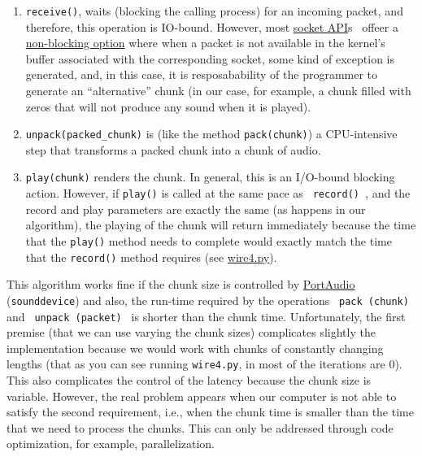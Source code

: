 \begin{enumerate}
\item \verb|receive()|, waits (blocking the calling process) for an
  incoming packet, and therefore, this operation is IO-bound. However,
  most \href{https://docs.python.org/3/library/socket.html}{socket
    API}s~\cite{python} offeer a
  \href{https://docs.python.org/3.8/library/socket.html#socket.socket.setblocking}{non-blocking
    option} where when a packet is not available in the kernel's
  buffer associated with the corresponding socket, some kind of
  exception is generated, and, in this case, it is resposabability of
  the programmer to generate an ``alternative'' chunk (in our case,
  for example, a chunk filled with zeros that will not produce any
  sound when it is played).

\item \verb|unpack(packed_chunk)| is (like the method
  \texttt{pack(chunk)}) a CPU-intensive step that transforms a
  packed chunk into a chunk of audio.

\item \verb|play(chunk)| renders the chunk. In general, this is an
  I/O-bound blocking action. However, if \verb|play()| is called at
  the same pace as \verb | record() |, and the record and play
  parameters are exactly the same (as happens in our algorithm), the
  playing of the chunk will return immediately because the time that
  the \verb|play()| method needs to complete would exactly match the
  time that the \verb|record()| method requires (see
  \href{https://github.com/Tecnologias-multimedia/InterCom/blob/master/test/sounddevice/wire4.py}{wire4.py}).
\end{enumerate}

This algorithm works fine if the chunk size is controlled by
\href{http://www.portaudio.com/}{PortAudio}~\cite{portaudio}
(\verb|sounddevice|) and also, the run-time required by
the operations \verb | pack (chunk) | and \verb | unpack (packet) | is shorter than the chunk time. Unfortunately, the first premise (that we can use
varying the chunk sizes) complicates slightly the implementation
because we would work with chunks of constantly changing lengths (that
as you can see running \verb|wire4.py|, in most of the iterations are
0). This also complicates the control of the latency because the chunk
size is variable. However, the real problem appears when our computer
is not able to satisfy the second requirement, i.e., when the chunk
time is smaller than the time that we need to process the chunks. This
can only be addressed through code optimization, for example,
parallelization.

